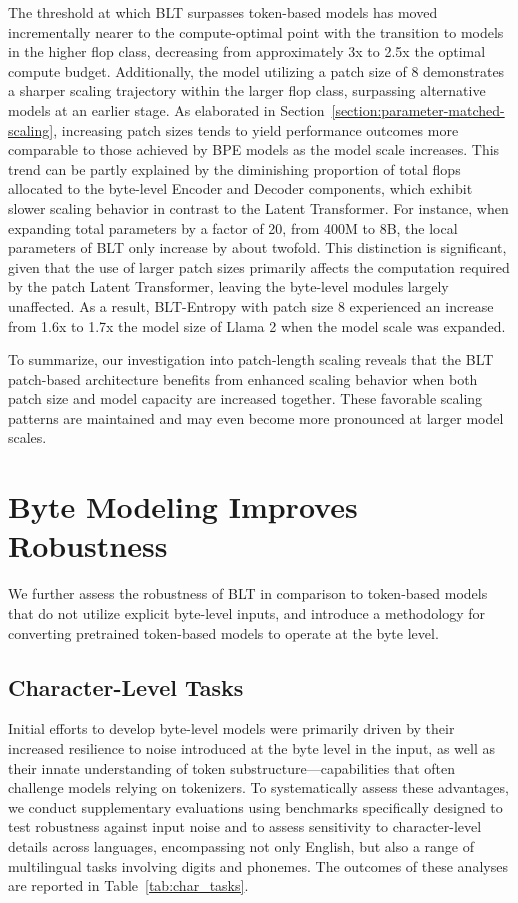 The threshold at which {\textsc BLT} surpasses token-based models has moved incrementally nearer to the compute-optimal point with the transition to models in the higher flop class, decreasing from approximately 3x to 2.5x the optimal compute budget. Additionally, the model utilizing a patch size of 8 demonstrates a sharper scaling trajectory within the larger flop class, surpassing alternative models at an earlier stage. As elaborated in Section~\ref{section:parameter-matched-scaling}, increasing patch sizes tends to yield performance outcomes more comparable to those achieved by BPE models as the model scale increases. This trend can be partly explained by the diminishing proportion of total flops allocated to the byte-level Encoder and Decoder components, which exhibit slower scaling behavior in contrast to the Latent Transformer. For instance, when expanding total parameters by a factor of 20, from 400M to 8B, the local parameters of {\textsc BLT} only increase by about twofold. This distinction is significant, given that the use of larger patch sizes primarily affects the computation required by the patch Latent Transformer, leaving the byte-level modules largely unaffected. As a result, {\textsc BLT}-Entropy with patch size 8 experienced an increase from 1.6x to 1.7x the model size of Llama 2 when the model scale was expanded.

To summarize, our investigation into patch-length scaling reveals that the {\textsc BLT} patch-based architecture benefits from enhanced scaling behavior when both patch size and model capacity are increased together. These favorable scaling patterns are maintained and may even become more pronounced at larger model scales.

\section{Byte Modeling Improves Robustness} We further assess the robustness of {\textsc BLT} in comparison to token-based models that do not utilize explicit byte-level inputs, and introduce a methodology for converting pretrained token-based models to operate at the byte level.
\label{sec:robustness}

\subsection{Character-Level Tasks}

Initial efforts to develop byte-level models were primarily driven by their increased resilience to noise introduced at the byte level in the input, as well as their innate understanding of token substructure—capabilities that often challenge models relying on tokenizers. To systematically assess these advantages, we conduct supplementary evaluations using benchmarks specifically designed to test robustness against input noise and to assess sensitivity to character-level details across languages, encompassing not only English, but also a range of multilingual tasks involving digits and phonemes. The outcomes of these analyses are reported in Table~\ref{tab:char_tasks}.

